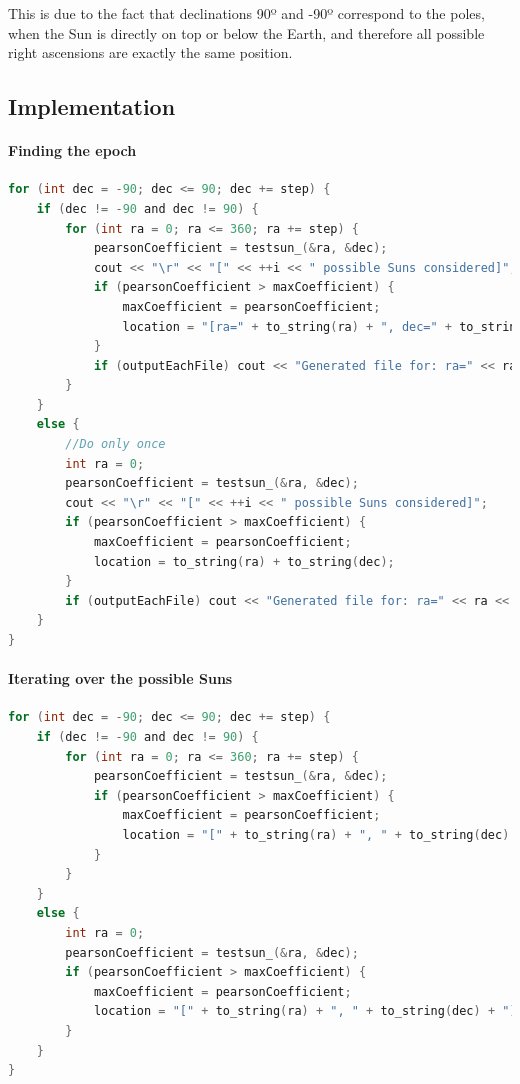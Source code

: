 This is due to the fact that declinations 90º and -90º correspond to the poles, when the Sun is directly on top or below the Earth, and therefore all possible right ascensions are exactly the same position.

\subsection{Implementation}

\paragraph{Finding the epoch}

\begin{minipage}{\linewidth}
\begin{lstlisting}[language=c, caption=Finding a VTEC spike]
for (int dec = -90; dec <= 90; dec += step) {
	if (dec != -90 and dec != 90) {
		for (int ra = 0; ra <= 360; ra += step) {
			pearsonCoefficient = testsun_(&ra, &dec);
			cout << "\r" << "[" << ++i << " possible Suns considered]";
			if (pearsonCoefficient > maxCoefficient) {
				maxCoefficient = pearsonCoefficient;
				location = "[ra=" + to_string(ra) + ", dec=" + to_string(dec) + "]";
			}
			if (outputEachFile) cout << "Generated file for: ra=" << ra << " dec=" << dec << " Pearson coefficient rxy = " << pearsonCoefficient << endl;
		}
	}
	else {
		//Do only once
		int ra = 0;
		pearsonCoefficient = testsun_(&ra, &dec);
		cout << "\r" << "[" << ++i << " possible Suns considered]";
		if (pearsonCoefficient > maxCoefficient) {
			maxCoefficient = pearsonCoefficient;
			location = to_string(ra) + to_string(dec);
		}
		if (outputEachFile) cout << "Generated file for: ra=" << ra << " dec=" << dec << " Pearson coefficient rxy = " << pearsonCoefficient << endl;
	}
}
\end{lstlisting}
\end{minipage}

\paragraph{Iterating over the possible Suns}
\begin{minipage}{\linewidth}
\begin{lstlisting}[language=c, caption=Main loops]
for (int dec = -90; dec <= 90; dec += step) {
	if (dec != -90 and dec != 90) {
		for (int ra = 0; ra <= 360; ra += step) {
			pearsonCoefficient = testsun_(&ra, &dec);
			if (pearsonCoefficient > maxCoefficient) {
				maxCoefficient = pearsonCoefficient;
				location = "[" + to_string(ra) + ", " + to_string(dec) + "]";
			}
		}
	}
	else {
		int ra = 0;
		pearsonCoefficient = testsun_(&ra, &dec);
		if (pearsonCoefficient > maxCoefficient) {
			maxCoefficient = pearsonCoefficient;
			location = "[" + to_string(ra) + ", " + to_string(dec) + "]";
		}
	}
}
\end{lstlisting}
\end{minipage}

